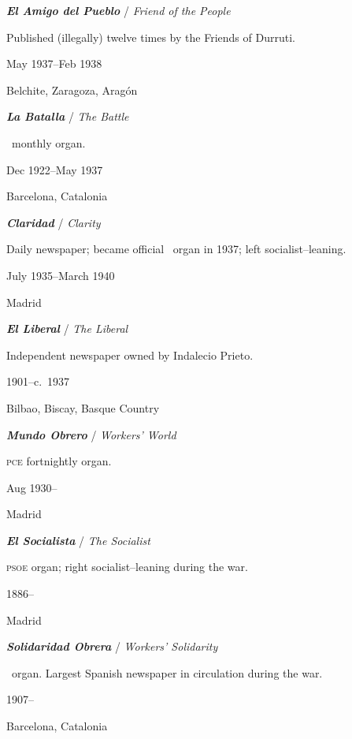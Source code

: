 \begin{multicols}{2}
  \RaggedRight
  \setlength{\parskip}{0.25\baselineskip}
  
  \textbf{\emph{El Amigo del Pueblo}}
  / \emph{Friend of the People}
  
  Published (illegally) twelve times by the Friends of Durruti. 
  
  May 1937--Feb 1938
  
  Belchite, Zaragoza, Aragón

  \bigskip

  \textbf{\emph{La Batalla}}
  / \emph{The Battle}

  \POUM\ monthly organ.
  
  Dec 1922--May 1937
  
  Barcelona, Catalonia

  \bigskip
  
  \textbf{\emph{Claridad}}
  / \emph{Clarity}

  Daily newspaper; became official \UGT\ organ in 1937; left socialist–leaning.
  
  July 1935--March 1940
  
  Madrid
  
  \bigskip
  
  \textbf{\emph{El Liberal}}
  / \emph{The Liberal}

  Independent newspaper owned by Indalecio Prieto.
  
  1901--c.~1937
  
  Bilbao, Biscay\kn, Basque Country

  \bigskip

  \textbf{\emph{Mundo Obrero}}
  / \emph{Workers' World}

  \textsc{pce} fortnightly organ.
  
  Aug 1930--
  
  Madrid
  
  \bigskip
  
  \textbf{\emph{El Socialista}}
  / \emph{The Socialist}

  \textsc{psoe} organ; right socialist–leaning during the war.
  
  1886--
  
  Madrid

  \bigskip
  
  \textbf{\emph{Solidaridad Obrera}}
  / \emph{Workers’ Solidarity}

  \CNT\ organ. Largest Spanish newspaper in circulation during the war.
  
  1907--
  
  Barcelona, Catalonia

\end{multicols}
